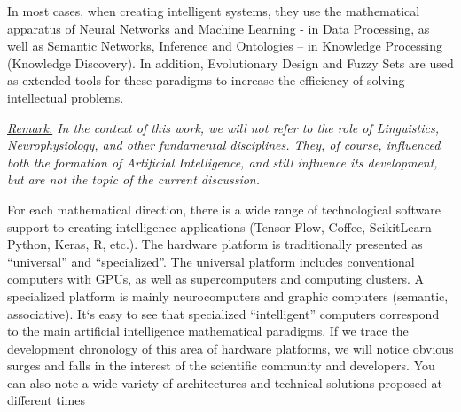 \documentclass[10pt]{article}
\begin{document}
{\begin{multicols*}{2}
In most cases, when creating intelligent systems, they
use the mathematical apparatus of Neural Networks
and Machine Learning - in Data Processing, as well
as Semantic Networks, Inference and Ontologies – in
Knowledge Processing (Knowledge Discovery). In addition, Evolutionary Design and Fuzzy Sets are used
as extended tools for these paradigms to increase the
efficiency of solving intellectual problems.

\textit{\underline{Remark.} In the context of this work, we will not refer
to the role of Linguistics, Neurophysiology, and other
fundamental disciplines. They, of course, influenced both
the formation of Artificial Intelligence, and still influence
its development, but are not the topic of the current
discussion.}

For each mathematical direction, there is a wide range
of technological software support to creating intelligence
applications (Tensor Flow, Coffee, ScikitLearn Python,
Keras, R, etc.). The hardware platform is traditionally
presented as “universal” and “specialized”. The universal platform includes conventional computers with
GPUs, as well as supercomputers and computing clusters.
A specialized platform is mainly neurocomputers and
graphic computers (semantic, associative). It‘s easy to
see that specialized “intelligent” computers correspond to
the main artificial intelligence mathematical paradigms.
If we trace the development chronology of this area
of hardware platforms, we will notice obvious surges
and falls in the interest of the scientific community
and developers. You can also note a wide variety of
architectures and technical solutions proposed at different
times \cite{first} \cite{second} \cite{third}


\end{multicols*}}
\end{document}
